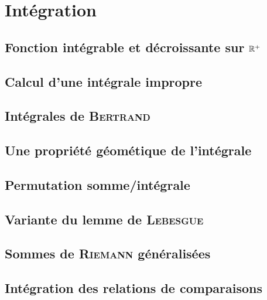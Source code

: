 \chapter{Intégration}

\section{Fonction intégrable et décroissante sur \texorpdfstring{$\mathbb{R}^+$}{R+}}


\section{Calcul d'une intégrale impropre}


\section{Intégrales de  \textsc{Bertrand}}


\section{Une propriété géométique de l'intégrale}


\section{Permutation somme/intégrale}


\section{Variante du lemme de \textsc{Lebesgue}}


\section{Sommes de \textsc{Riemann} généralisées}


\section{Intégration des relations de comparaisons}


